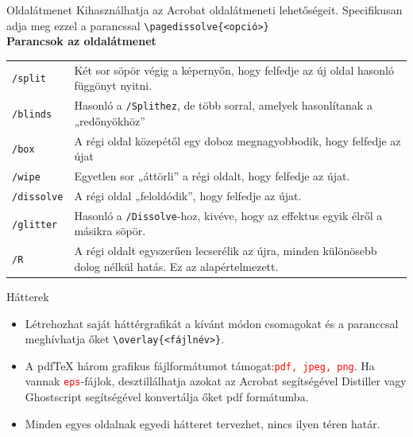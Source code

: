 \documentclass{beamer}
\begin{document}
\begin{frame}[fragile]{Oldalátmenet}
Kihasználhatja az Acrobat oldalátmeneti lehetőségeit.
Specifikusan adja meg ezzel a parancssal
\color{red}\verb|\pagedissolve{<opció>}| \color{black} \\
\textbf{Parancsok az oldalátmenet} \\
\begin{table}[h]
\begin{tabularx}{\textwidth}{l X}
\verb|/split| & Két sor söpör végig a képernyőn, hogy felfedje az új oldal hasonló függönyt nyitni. \\
\verb|/blinds| & Hasonló a \verb|/Splithez|, de több sorral, amelyek hasonlítanak a „redőnyökhöz” \\

\verb|/box|& A régi oldal közepétől egy doboz megnagyobbodik, hogy felfedje az újat \\

\verb|/wipe|& Egyetlen sor „áttörli” a régi oldalt, hogy felfedje az újat. \\

\verb|/dissolve|& A régi oldal „feloldódik”, hogy felfedje az újat. \\

 \verb|/glitter|& Hasonló a \verb|/Dissolve|-hoz, kivéve, hogy az effektus egyik élről a másikra söpör. \\

\verb|/R|&  A régi oldalt egyszerűen lecserélik az újra, minden különösebb dolog nélkül hatás. Ez az alapértelmezett. \\


\end{tabularx}
\end{table}

\end{frame}


\begin{frame}[fragile]{Hátterek}
\begin{itemize}
\item Létrehozhat saját háttérgrafikát a kívánt módon
csomagokat és a paranccsal meghívhatja őket
\color{red}\verb|\overlay{<fájlnév>}|\color{black}.
\pause

\item A pdf\TeX{} három grafikus fájlformátumot támogat:\textcolor{red}{\tt pdf, jpeg, png}. Ha vannak \textcolor{red}{\tt eps}-fájlok, desztillálhatja azokat az Acrobat segítségével
Distiller vagy Ghostscript segítségével konvertálja őket pdf formátumba.
\pause

\item Minden egyes oldalnak egyedi hátteret tervezhet, nincs ilyen téren
határ.


\end{itemize}
\end{frame}
\end{document}
